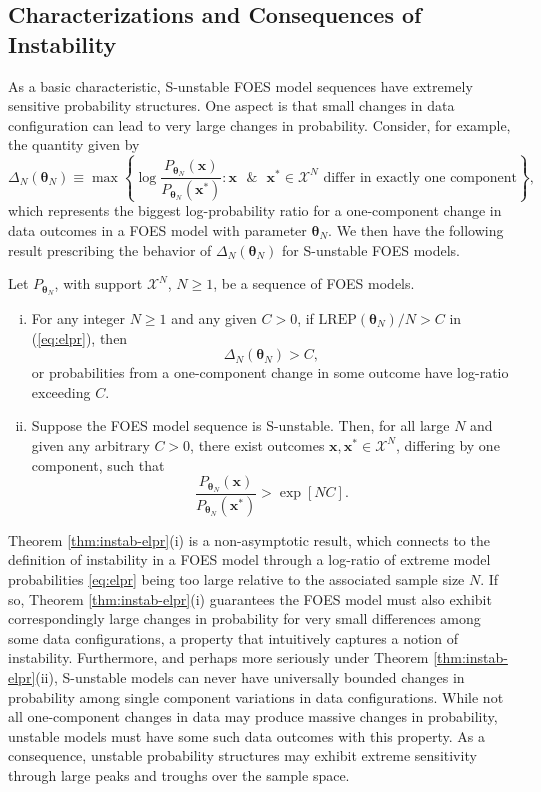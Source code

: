 \documentclass[]{article}
\theoremstyle{definition}
\newcommand{\REP}{\mathrm{LREP}}
\newcommand{\DN}{\Delta_N}
\let\BeginKnitrBlock\begin \let\EndKnitrBlock\end
\begin{document}
\subsection{Characterizations and Consequences of
Instability}\label{characterizations-and-consequences-of-instability}

As a basic characteristic, S-unstable FOES model sequences have
extremely sensitive probability structures. One aspect is that small
changes in data configuration can lead to very large changes in
probability. Consider, for example, the quantity given by \[
\DN(\boldsymbol \theta_N) \equiv \max \left\{\log \frac{P_{\boldsymbol \theta_N}(\boldsymbol x)}{P_{\boldsymbol \theta_N}(\boldsymbol x^*)} : \boldsymbol x \text{ }\& \text{ } \boldsymbol x^* \in \mathcal{X}^N \text{ differ in exactly one component}\right\},
\] which represents the biggest log-probability ratio for a
one-component change in data outcomes in a FOES model with parameter
\(\boldsymbol \theta_N\). We then have the following result prescribing
the behavior of \(\DN(\boldsymbol \theta_N)\) for S-unstable FOES
models.

\BeginKnitrBlock{theorem}
\protect\hypertarget{thm:instab-elpr}{}{\label{thm:instab-elpr} }Let
\(P_{\boldsymbol \theta_N}\), with support \(\mathcal{X}^N\),
\(N\geq 1\), be a sequence of FOES models.
\begin{enumerate}[(i)]
\item For any integer $N \geq 1$ and any given $C>0$, if $\REP(\boldsymbol \theta_N)/N > C$ in (\ref{eq:elpr}), then
    $$ \DN(\boldsymbol \theta_N) > C,$$
    or probabilities from a one-component change in some outcome have log-ratio exceeding $C$.
\item Suppose the FOES model sequence is S-unstable. Then, for all large $N$ and given any arbitrary $C>0$, there exist outcomes $\boldsymbol x,\boldsymbol x^*\in\mathcal{X}^N$, differing by one component, such that
    $$
    \frac{P_{\boldsymbol \theta_N}(\boldsymbol x)}{P_{\boldsymbol \theta_N}(\boldsymbol x^*)} > \exp[N C].
    $$
\end{enumerate}
\EndKnitrBlock{theorem}

Theorem \ref{thm:instab-elpr}(i) is a non-asymptotic result, which
connects to the definition of instability in a FOES model through a
log-ratio of extreme model probabilities \eqref{eq:elpr} being too large
relative to the associated sample size \(N\). If so, Theorem
\ref{thm:instab-elpr}(i) guarantees the FOES model must also exhibit
correspondingly large changes in probability for very small differences
among some data configurations, a property that intuitively captures a
notion of instability. Furthermore, and perhaps more seriously under
Theorem \ref{thm:instab-elpr}(ii), S-unstable models can never have
universally bounded changes in probability among single component
variations in data configurations. While not all one-component changes
in data may produce massive changes in probability, unstable models must
have some such data outcomes with this property. As a consequence,
unstable probability structures may exhibit extreme sensitivity through
large peaks and troughs over the sample space.
\end{document}
